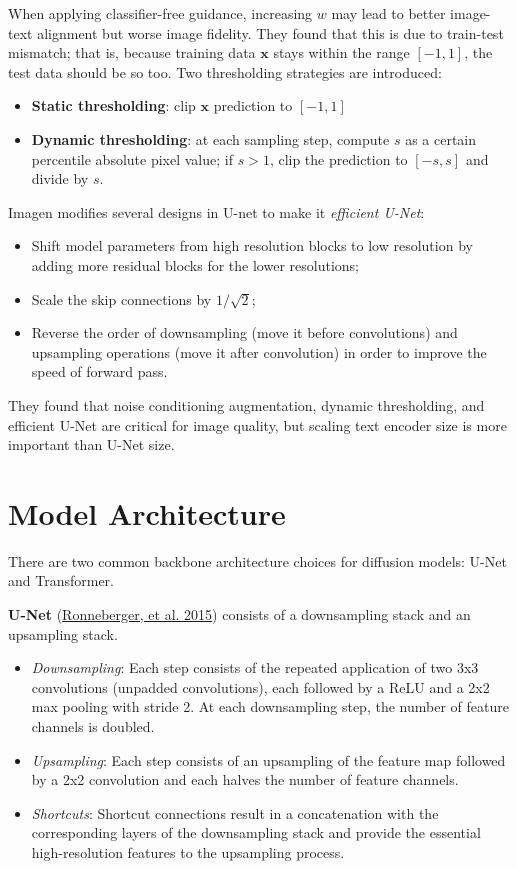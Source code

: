 \documentclass[12pt]{article}
\begin{document}
When applying classifier-free guidance, increasing $w$ may lead to better image-text alignment but worse image fidelity. They found that this is due to train-test mismatch; that is, because training data $\mathbf{x}$ stays within the range $[-1, 1]$, the test data should be so too. Two thresholding strategies are introduced:
\begin{itemize}
    \item \textbf{Static thresholding}: clip $\mathbf{x}$ prediction to $[-1, 1]$
    \item \textbf{Dynamic thresholding}: at each sampling step, compute $s$ as a certain percentile absolute pixel value; if $s > 1$, clip the prediction to $[-s, s]$ and divide by $s$.
\end{itemize}

Imagen modifies several designs in U-net to make it \emph{efficient U-Net}:
\begin{itemize}
    \item Shift model parameters from high resolution blocks to low resolution by adding more residual blocks for the lower resolutions;
    \item Scale the skip connections by $1/\sqrt{2}$;
    \item Reverse the order of downsampling (move it before convolutions) and upsampling operations (move it after convolution) in order to improve the speed of forward pass.
\end{itemize}

They found that noise conditioning augmentation, dynamic thresholding, and efficient U-Net are critical for image quality, but scaling text encoder size is more important than U-Net size.

\section{Model Architecture}
There are two common backbone architecture choices for diffusion models: U-Net and Transformer.

\textbf{U-Net} (\href{https://arxiv.org/abs/1505.04597}{Ronneberger, et al. 2015}) consists of a downsampling stack and an upsampling stack.
\begin{itemize}
    \item \emph{Downsampling}: Each step consists of the repeated application of two 3x3 convolutions (unpadded convolutions), each followed by a ReLU and a 2x2 max pooling with stride 2. At each downsampling step, the number of feature channels is doubled.
    \item \emph{Upsampling}: Each step consists of an upsampling of the feature map followed by a 2x2 convolution and each halves the number of feature channels.
    \item \emph{Shortcuts}: Shortcut connections result in a concatenation with the corresponding layers of the downsampling stack and provide the essential high-resolution features to the upsampling process.
\end{itemize}
\end{document}
